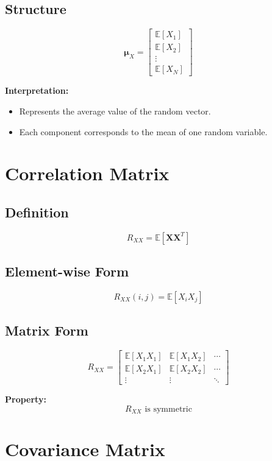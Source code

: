 \documentclass[11pt]{article}
\begin{document}
\subsection{Structure}

\[
\boldsymbol{\mu}_X =
\begin{bmatrix}
\mathbb{E}[X_1] \\
\mathbb{E}[X_2] \\
\vdots \\
\mathbb{E}[X_N]
\end{bmatrix}
\]

\textbf{Interpretation:}
\begin{itemize}
    \item Represents the average value of the random vector.
    \item Each component corresponds to the mean of one random variable.
\end{itemize}

\section{Correlation Matrix}

\subsection{Definition}

\[
R_{XX} = \mathbb{E}[\mathbf{X}\mathbf{X}^T]
\]

\subsection{Element-wise Form}

\[
R_{XX}(i,j) = \mathbb{E}[X_i X_j]
\]

\subsection{Matrix Form}

\[
R_{XX} =
\begin{bmatrix}
\mathbb{E}[X_1X_1] & \mathbb{E}[X_1X_2] & \cdots \\
\mathbb{E}[X_2X_1] & \mathbb{E}[X_2X_2] & \cdots \\
\vdots & \vdots & \ddots
\end{bmatrix}
\]

\textbf{Property:}
\[
R_{XX} \text{ is symmetric}
\]

\section{Covariance Matrix}
\end{document}
